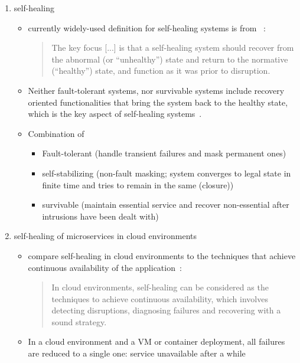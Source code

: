 \begin{enumerate}
    \item self-healing
      \begin{itemize}
        \item currently widely-used definition for self-healing systems is from \citeauthor{Ghosh}~\cite{Ghosh}:
          \begin{quote}
            The key focus [...] is that a self-healing system should recover from the abnormal (or \enquote{unhealthy}) state and return to the normative (\enquote{healthy}) state, and function as it was prior to disruption.
          \end{quote}
        \item Neither fault-tolerant systems, nor survivable systems include recovery oriented functionalities that bring the system back to the healthy state, which is the key aspect of self-healing systems~\cite{Ghosh}.
        \item Combination of~\cite{PsaierSurvey}
          \begin{itemize}
            \item Fault-tolerant (handle transient failures and mask permanent ones)
            \item self-stabilizing (non-fault masking; system converges to legal state in finite time and tries to remain in the same (closure))
            \item survivable (maintain essential service and recover non-essential after intrusions have been dealt with)
          \end{itemize}
      \end{itemize}

    \item self-healing of microservices in cloud environments
      \begin{itemize}
        \item \citeauthor{PsaierSurvey} compare self-healing in cloud environments to the techniques that achieve continuous availability of the application~\cite{PsaierSurvey}:
          \begin{quote}
            In cloud environments, self-healing can be considered as the techniques to achieve continuous availability, which involves detecting disruptions, diagnosing failures and recovering with a sound strategy.
          \end{quote}
        \item In a cloud environment and a VM or container deployment, all failures are reduced to a single one: service unavailable after a while
      \end{itemize}
  \end{enumerate}

